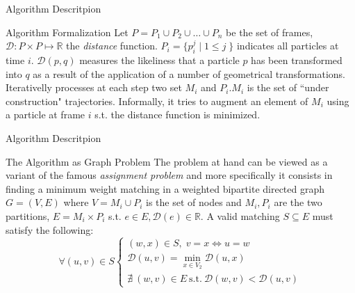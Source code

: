 \documentclass{beamer}
\begin{document}
  \begin{frame}{Algorithm Descritpion}
		\begin{exampleblock}{Algorithm Formalization}
Let $P=P_1 \cup P_2 \cup \ldots \cup P_n$ be the set of frames, $\mathcal{D} :  P \times P \mapsto \mathbb{R}$ the \textit{distance} function. $P_i = \{p^j_i \; | \; 1 \leq j\; \}$ indicates all particles at time $i$. $\mathcal{D}(p,q)$ measures the likeliness that a particle $p$ has been transformed into $q$ as a result of the application of a number of geometrical transformations. 
Iterativelly processes at each step two set $M_i$ and $P_i$.$M_i$ is the set of ``under construction" trajectories. Informally, it tries to augment an element of $M_i$ using a particle at frame $i$ s.t. the distance function is minimized.

		\end{exampleblock}		

		
		
\end{frame} %

  \begin{frame}{Algorithm Descritpion}
		\begin{exampleblock}{The Algorithm as  Graph Problem}
			The problem at hand can be viewed as a variant of the famous \textit{assignment problem} and more specifically it consists in finding a minimum weight matching in  a weighted bipartite directed graph $G=(V,E)$ where $V={M_i} \cup P_i$ is the set of nodes and ${M_i}, P_i$ are the two partitions, $E = {M_i} \times P_i$ s.t. $e \in E, \mathcal{D}(e) \in \mathbb{R}$.
A valid matching $S \subseteq E$ must satisfy the following: 
\begin{equation}
\forall (u,v) \in S 
\left\{
  \begin{array}{lr}
   (w,x) \in S,\; v=x\Longleftrightarrow u=w\\
   \mathcal{D}(u,v) = \min_{x \in V_2} \mathcal{D}(u,x)  \\
    \nexists \: (w,v) \in E \: \mbox{s.t.} \: \mathcal{D}(w,v) < \mathcal{D}(u,v)
  \end{array}
\right.
\label{matchConstraints}
\end{equation}

		\end{exampleblock}		

		
		
\end{frame} %
\end{document}
